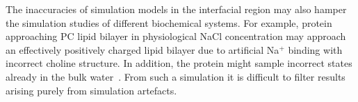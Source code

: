 \documentclass[aps,prl,superscriptaddress,twocolumn]{revtex4}
\begin{document}
The inaccuracies of simulation models in the interfacial region may also hamper the simulation 
studies of different biochemical systems. For example, protein approaching
PC lipid bilayer in physiological NaCl concentration may approach an effectively positively charged 
lipid bilayer due to artificial Na$^+$ binding with incorrect choline structure. In addition,
the protein might sample incorrect states already in the bulk water~\cite{best11,beauchamp12,rauscher15}.
From such a simulation it is difficult to filter results arising purely from simulation artefacts.





%

\begin{acknowledgments}
\end{acknowledgments}



\onecolumngrid
\listoftodos
\end{document}
